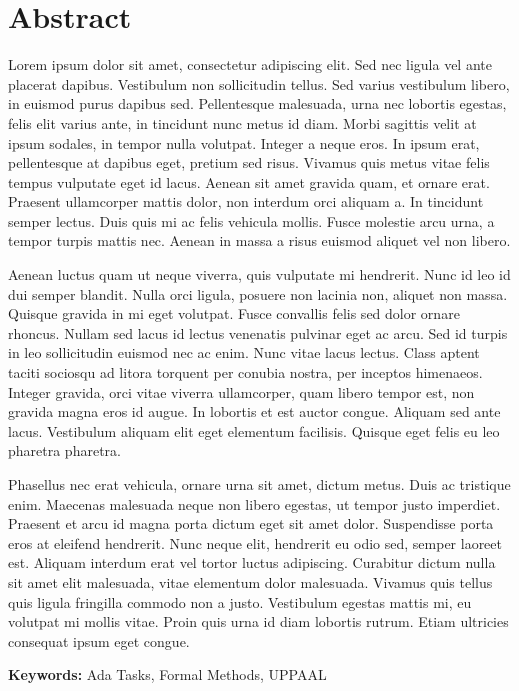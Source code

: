 \chapter*{Abstract}
\thispagestyle{empty} %
Lorem ipsum dolor sit amet, consectetur adipiscing elit. Sed nec ligula vel
ante placerat dapibus. Vestibulum non sollicitudin tellus. Sed varius
vestibulum libero, in euismod purus dapibus sed. Pellentesque malesuada,
urna nec lobortis egestas, felis elit varius ante, in tincidunt nunc metus
id diam. Morbi sagittis velit at ipsum sodales, in tempor nulla volutpat.
Integer a neque eros. In ipsum erat, pellentesque at dapibus eget, pretium
sed risus. Vivamus quis metus vitae felis tempus vulputate eget id lacus.
Aenean sit amet gravida quam, et ornare erat. Praesent ullamcorper mattis
dolor, non interdum orci aliquam a. In tincidunt semper lectus. Duis quis
mi ac felis vehicula mollis. Fusce molestie arcu urna, a tempor turpis
mattis nec. Aenean in massa a risus euismod aliquet vel non libero.

Aenean luctus quam ut neque viverra, quis vulputate mi hendrerit. Nunc id leo
id dui semper blandit. Nulla orci ligula, posuere non lacinia non, aliquet non
massa. Quisque gravida in mi eget volutpat. Fusce convallis felis sed dolor
ornare rhoncus. Nullam sed lacus id lectus venenatis pulvinar eget ac arcu. Sed
id turpis in leo sollicitudin euismod nec ac enim. Nunc vitae lacus lectus.
Class aptent taciti sociosqu ad litora torquent per conubia nostra, per
inceptos himenaeos. Integer gravida, orci vitae viverra ullamcorper, quam
libero tempor est, non gravida magna eros id augue. In lobortis et est auctor
congue. Aliquam sed ante lacus. Vestibulum aliquam elit eget elementum
facilisis. Quisque eget felis eu leo pharetra pharetra.

Phasellus nec erat vehicula, ornare urna sit amet, dictum metus. Duis ac
tristique enim. Maecenas malesuada neque non libero egestas, ut tempor justo
imperdiet. Praesent et arcu id magna porta dictum eget sit amet dolor.
Suspendisse porta eros at eleifend hendrerit. Nunc neque elit, hendrerit eu
odio sed, semper laoreet est. Aliquam interdum erat vel tortor luctus
adipiscing. Curabitur dictum nulla sit amet elit malesuada, vitae elementum
dolor malesuada. Vivamus quis tellus quis ligula fringilla commodo non a justo.
Vestibulum egestas mattis mi, eu volutpat mi mollis vitae. Proin quis urna id
diam lobortis rutrum. Etiam ultricies consequat ipsum eget congue.

\textbf{Keywords:} Ada Tasks, Formal Methods, UPPAAL
